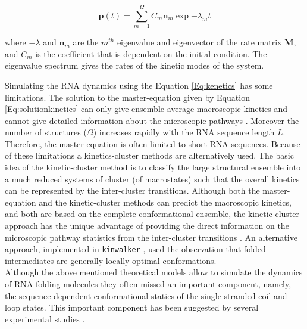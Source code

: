 \begin{equation}
	\label{Eq:solutionkinetics}
	\textbf{p}(t) = \sum_{m=1}^{\Omega} {C_m \textbf{n}_m \exp{-\lambda_m t}}
\end{equation}

where $-\lambda$ and $\textbf{n}_m$ are the $m^{th}$ eigenvalue and eigenvector of the rate matrix \textbf{M}, and $C_m$ is the coefficient that is dependent on the initial condition. The eigenvalue spectrum gives the rates of the kinetic modes of the system.

Simulating the RNA dynamics using the Equation \ref{Eq:kenetics} has some limitations. The solution to the master-equation given by Equation \ref{Eq:solutionkinetics} can only give ensemble-average macroscopic kinetics and cannot give detailed information about the microscopic pathways \cite{zhang06_explor_compl_foldin_kinet_rna_hairp}. Moreover the number of structures ($\Omega$) increases rapidly with the RNA sequence length $L$.  Therefore, the master equation is often limited to short RNA sequences. Because of these limitations a kinetics-cluster methods are alternatively used. The basic idea of the kinetic-cluster method is to classify the large structural ensemble into a much reduced systems of cluster (of macrostates) such that the overall kinetics can be represented by the inter-cluster transitions. Although both the master-equation and the kinetic-cluster methods can predict the macroscopic kinetics, and both are based on the complete conformational ensemble, the kinetic-cluster approach has the unique advantage of providing the direct information on the microscopic pathway statistics from the inter-cluster transitions \cite{zhang06_explor_compl_foldin_kinet_rna_hairp}. An alternative approach, implemented in \texttt{kinwalker} \cite{geis2008folding}, used the observation that folded intermediates are generally locally optimal conformations.  
\\
Although the above mentioned theoretical models allow to simulate the dynamics of RNA folding molecules they often missed an important component, namely, the sequence-dependent conformational statics of the single-stranded coil and loop states. This important component has been suggested by several experimental studies \cite{nagel2006structural, bonnet1998kinetics}. 
